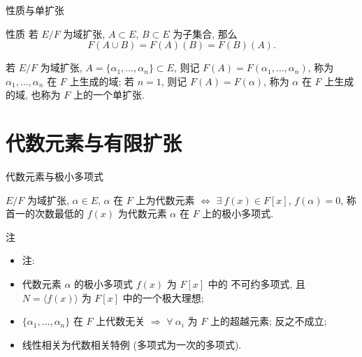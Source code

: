 
\begin{frame}{性质与单扩张}

\begin{block}{性质}
若 $E/F$ 为域扩张, $A \subset E$, $B \subset E$ 为子集合, 那么
\[
F(A \cup B) = F(A)(B) = F(B)(A).
\]
\end{block}

\pause

若 $E/F$ 为域扩张, $A = \{ \alpha_1, \dots, \alpha_n \} \subset E$,
则记 $F(A) = F(\alpha_1, \dots, \alpha_n)$, 称为 $\alpha_1, \dots, \alpha_n$
在 $F$ 上生成的域; 若 $n = 1$, 则记 $F(A) = F(\alpha)$, 称为 $\alpha$ 在 $F$
上生成的域, 也称为 $F$ 上的一个单扩张.

\end{frame}


\section[代数元]{代数元素与有限扩张}


\begin{frame}{代数元素与极小多项式}

$E/F$ 为域扩张, $\alpha \in E$, $\alpha$ 在 $F$ 上为代数元素
$\iff$ $\exists\ f(x) \in F[x]$, $f(\alpha) = 0$,
称首一的次数最低的 $f(x)$ 为代数元素 $\alpha$ 在 $F$ 上的极小多项式.

\end{frame}


\begin{frame}{注}

\begin{itemize}
\item 注:
\item {} 代数元素 $\alpha$ 的极小多项式 $f(x)$ 为 $F[x]$ 中的
  不可约多项式, 且 $N = \langle f(x) \rangle$ 为 $F[x]$ 中的一个极大理想;
\item {} $\{\alpha_1, \dots, \alpha_n\}$ 在 $F$ 上代数无关
  $\Longrightarrow$ $\forall\ \alpha_i$ 为 $F$ 上的超越元素; 反之不成立;
\item {} 线性相关为代数相关特例 (多项式为一次的多项式).
\end{itemize}

\end{frame}

